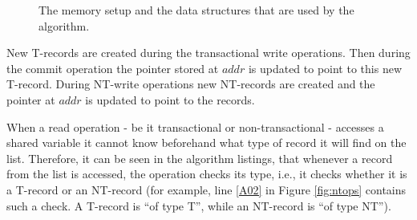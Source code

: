 \documentclass[11pt,letterpaper]{article}
\begin{document}
\begin{figure*}[h]
\centerline{
}
\caption{The memory setup and the data structures that are used by the 
algorithm.}
\label{fig:mem_setup}
\end{figure*}

New T-records are created during the transactional write operations.
Then during
the commit operation the pointer stored at $\mathit{addr}$ is updated to point to this new T-record.
During NT-write operations new NT-records are created and the pointer at $\mathit{addr}$
is updated to point to the records.

When a read operation - be it transactional or non-transactional - accesses 
a shared variable it cannot know beforehand what type of record it will find 
on the list. Therefore, it can be seen in the algorithm listings, that whenever 
a record from the list is accessed, 
the operation checks its type, i.e., it checks 
whether it is a T-record or an NT-record (for example, line \ref{A02} in Figure 
\ref{fig:ntops} contains such a check. A T-record is {}``of type T'', while an 
NT-record is {}``of type NT''). 
\end{document}
